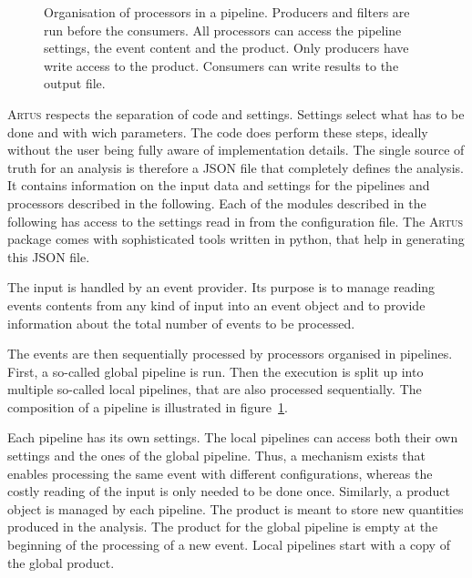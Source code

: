 \documentclass[3p]{elsarticle}
\newcommand{\software}[1]{\textsc{#1}\xspace}
\newcommand{\artus}{\software{Artus}}
\begin{document}
\begin{figure}[p]
\centering 
\caption[Structure of an \artus analysis.]{Structure of an \artus analysis.
The input is read by an event provider.
Within the pipelines the event content is analysed by the processors.
Consumers in local pipelines write results to a common output.
All parts of the analysis are configurable.}
\label{figure_artus_structure}

\vspace{10ex}

\centering 
\caption[Organisation of processors in a pipeline.]{Organisation of processors in a pipeline.
Producers and filters are run before the consumers.
All processors can access the pipeline settings, the event content and the product.
Only producers have write access to the product.
Consumers can write results to the output file.}
\label{figure_artus_pipeline}
\end{figure}

\artus respects the separation of code and settings.
Settings select what has to be done and with wich parameters.
The code does perform these steps, ideally without the user being fully aware of implementation details.
The single source of truth for an analysis is therefore a JSON file that completely defines the analysis.
It contains information on the input data and settings for the pipelines and processors described in the following.
Each of the modules described in the following has access to the settings read in from the configuration file.
The \artus package comes with sophisticated tools written in python, that help in generating this JSON file.

The input is handled by an event provider.
Its purpose is to manage reading events contents from any kind of input into an event object and to provide information about the total number of events to be processed.

The events are then sequentially processed by processors organised in pipelines.
First, a so-called global pipeline is run.
Then the execution is split up into multiple so-called local pipelines, that are also processed sequentially.
The composition of a pipeline is illustrated in figure~\ref{figure_artus_pipeline}.

Each pipeline has its own settings.
The local pipelines can access both their own settings and the ones of the global pipeline.
Thus, a mechanism exists that enables processing the same event with different configurations, whereas the costly reading of the input is only needed to be done once.
Similarly, a product object is managed by each pipeline.
The product is meant to store new quantities produced in the analysis.
The product for the global pipeline is empty at the beginning of the processing of a new event.
Local pipelines start with a copy of the global product.
\end{document}
